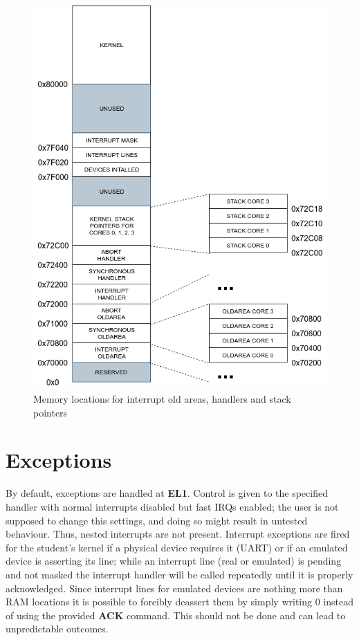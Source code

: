 \documentclass[12pt,a4paper,openright,twoside]{report}
\begin{document}
 \begin{figure}[ht]
    \begin{center}
 \includegraphics[scale=0.55]{images/tesi14.png}
 \caption[Memory Map]{Memory locations for interrupt old areas, handlers 
 and stack pointers}\label{fig:memmap}
    \end{center}
 \end{figure}

\section{Exceptions}
By default, exceptions are handled at \textbf{EL1}. Control is given to the 
specified handler with normal interrupts disabled but fast IRQs enabled; the user
is not supposed to change this settings, and doing so might result in untested
behaviour.
Thus, nested interrupts are not present. Interrupt exceptions are fired
for the student's kernel if a physical device requires it (UART) or if an 
emulated device is asserting its line; while an interrupt line (real or 
emulated) is pending and not masked the interrupt handler will be called repeatedly
until it is properly acknowledged.
Since interrupt lines for emulated devices are nothing more than RAM locations
it is possible to forcibly deassert them by simply writing 0 instead of using
the provided \textbf{ACK} command. This should not be done and can lead to 
unpredictable outcomes.
\end{document}
